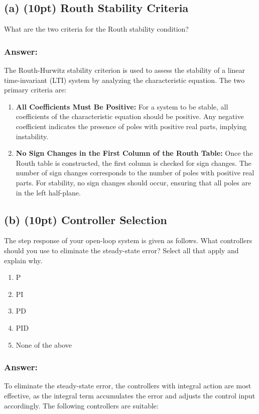\documentclass{article}
\begin{document}
\subsection*{(a) (10pt) Routh Stability Criteria}

\noindent
What are the two criteria for the Routh stability condition?

\subsubsection*{Answer:}
The Routh-Hurwitz stability criterion is used to assess the stability of a linear time-invariant (LTI) system by analyzing the characteristic equation. The two primary criteria are:

\begin{enumerate}
    \item \textbf{All Coefficients Must Be Positive:} For a system to be stable, all coefficients of the characteristic equation should be positive. Any negative coefficient indicates the presence of poles with positive real parts, implying instability.
    
    \item \textbf{No Sign Changes in the First Column of the Routh Table:} Once the Routh table is constructed, the first column is checked for sign changes. The number of sign changes corresponds to the number of poles with positive real parts. For stability, no sign changes should occur, ensuring that all poles are in the left half-plane.
\end{enumerate}

\subsection*{(b) (10pt) Controller Selection}

\noindent
The step response of your open-loop system is given as follows. What controllers should you use to eliminate the steady-state error? Select all that apply and explain why.

\begin{enumerate}
    \item P
    \item PI
    \item PD
    \item PID
    \item None of the above
\end{enumerate}

\subsubsection*{Answer:}
To eliminate the steady-state error, the controllers with integral action are most effective, as the integral term accumulates the error and adjusts the control input accordingly. The following controllers are suitable:
\end{document}
